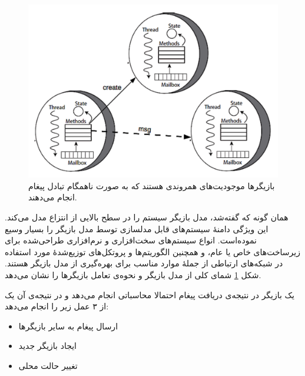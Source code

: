 \begin{figure}
    \begin{center}
	\includegraphics[width=12cm]{2-Preliminaries/Figures/Actor_Structure.pdf}
    \end{center}
    \caption{\label{fig:actorStructure} بازیگر‌ها موجودیت‌های همروندی هستند که به صورت ناهمگام تبادل پیغام انجام ‌می‌دهند. }
\end{figure}


همان گونه که گفته‌شد، مدل بازیگر سیستم را در سطح بالایی از انتزاع مدل می‌کند.
این ویژگی دامنهٔ سیستم‌های قابل مدلسازی توسط مدل بازیگر را بسیار وسیع نموده‌است.
انواع سیستم‌های سخت‌افزاری و نرم‌افزاری طراحی‌شده برای زیرساخت‌های خاص یا عام، و همچنین الگوریتم‌ها و پروتکل‌های توزیع‌شدهٔ مورد استفاده در شبکه‌های ارتباطی از جملهٔ موارد مناسب برای بهره‌گیری از مدل بازیگر هستند. شکل \ref{fig:actorStructure} شمای کلی از مدل بازیگر و نحوه‌ی تعامل بازیگر‌ها را نشان می‌دهد.
 
 یک بازیگر در نتیجه‌ی دریافت پیغام احتمالا محاسباتی انجام می‌دهد و در نتیجه‌ی آن یک از ۳ عمل زیر را انجام می‌دهد:
\begin{itemize}
\item ارسال پیغام به سایر بازیگر‌ها
\item ایجاد بازیگر جدید
\item تغییر حالت محلی
\end{itemize} 

